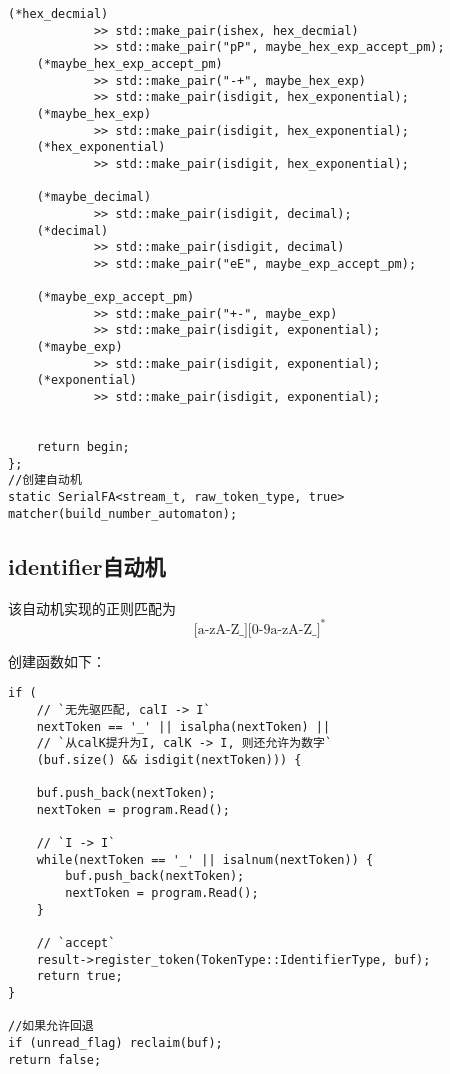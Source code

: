 \documentclass[UTF8]{ctexart}
\begin{document}
{\begin{lstlisting}[language={[ANSI]C++}]
    (*hex_decmial)
            >> std::make_pair(ishex, hex_decmial)
            >> std::make_pair("pP", maybe_hex_exp_accept_pm);
    (*maybe_hex_exp_accept_pm)
            >> std::make_pair("-+", maybe_hex_exp)
            >> std::make_pair(isdigit, hex_exponential);
    (*maybe_hex_exp)
            >> std::make_pair(isdigit, hex_exponential);
    (*hex_exponential)
            >> std::make_pair(isdigit, hex_exponential);

    (*maybe_decimal)
            >> std::make_pair(isdigit, decimal);
    (*decimal)
            >> std::make_pair(isdigit, decimal)
            >> std::make_pair("eE", maybe_exp_accept_pm);
    
    (*maybe_exp_accept_pm)
            >> std::make_pair("+-", maybe_exp)
            >> std::make_pair(isdigit, exponential);
    (*maybe_exp)
            >> std::make_pair(isdigit, exponential);
    (*exponential)
            >> std::make_pair(isdigit, exponential);
    

    return begin;
};
//创建自动机
static SerialFA<stream_t, raw_token_type, true> matcher(build_number_automaton);
\end{lstlisting}
}
\subsection{identifier自动机}
\begin{figure}[!h]
    \centering
\end{figure}
该自动机实现的正则匹配为
$$
    \text{[a-zA-Z\_]}\text{[0-9a-zA-Z\_]}^*
$$
\par 创建函数如下：
{\firacode
\begin{lstlisting}[language={[ANSI]C++}]
if (
    // `无先驱匹配, calI -> I`
    nextToken == '_' || isalpha(nextToken) ||
    // `从calK提升为I, calK -> I, 则还允许为数字`
    (buf.size() && isdigit(nextToken))) {
    
    buf.push_back(nextToken);
    nextToken = program.Read();

    // `I -> I`
    while(nextToken == '_' || isalnum(nextToken)) {
        buf.push_back(nextToken);
        nextToken = program.Read();
    }

    // `accept`
    result->register_token(TokenType::IdentifierType, buf);
    return true;
}

//如果允许回退
if (unread_flag) reclaim(buf);
return false;
\end{lstlisting}
}
\newpage
\end{document}
